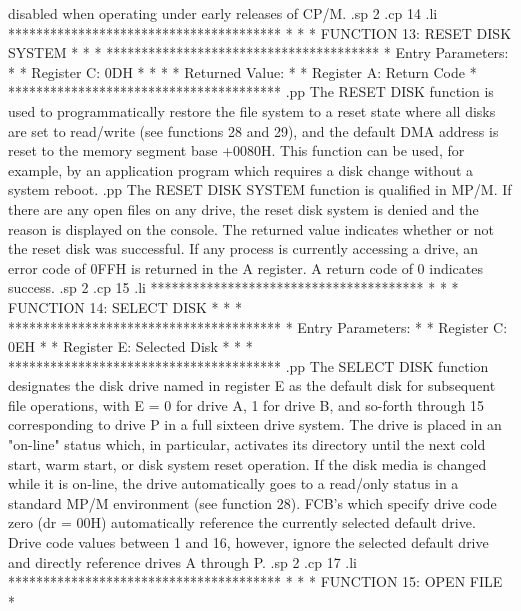 disabled when operating under early releases of CP/M.
.sp 2
.cp 14
.li
***************************************
*                                     *
*  FUNCTION 13: RESET DISK SYSTEM     *
*                                     *
***************************************
*  Entry Parameters:                  *
*      Register   C:  0DH             *
*                                     *
*  Returned Value:                    *
*      Register   A:  Return Code     *
***************************************
.pp
The RESET DISK function is used to programmatically restore
the file system to a reset state where all disks are set to
read/write (see functions 28 and 29),
and the default DMA address is reset to the memory segment base +0080H.
This function can be used, for example, by an application
program which requires a disk change without a system reboot.
.pp
The  RESET DISK SYSTEM function is qualified in  MP/M.  If
there  are  any open files on any  drive, the  reset  disk
system  is  denied  and  the reason  is  displayed  on  the
console.
The returned value indicates whether or not the reset  disk
was  successful.  If any process is currently accessing  a
drive, an error code of 0FFH is returned in the A register.
A return code of 0 indicates success.
.sp 2
.cp 15
.li
***************************************
*                                     *
*  FUNCTION 14: SELECT DISK           *
*                                     *
***************************************
*  Entry Parameters:                  *
*      Register   C:  0EH             *
*      Register   E:  Selected Disk   *
*                                     *
***************************************
.pp
The SELECT DISK function designates the disk drive named in
register E as the default disk for subsequent file operations,
with E = 0 for drive A, 1 for drive B, and so-forth through
15 corresponding to drive P in a full sixteen drive system.
The drive is placed in an "on-line" status which, in particular,
activates its directory until the next cold start, warm start,
or disk system reset operation.  If the disk media is changed
while it is on-line, the drive automatically goes to a read/only
status in a standard MP/M environment (see function 28).
FCB's which specify drive code zero (dr = 00H) automatically
reference the currently selected default drive.  Drive code
values between 1 and 16, however, ignore the selected default
drive and directly reference drives A through P.
.sp 2
.cp 17
.li
***************************************
*                                     *
*  FUNCTION 15: OPEN FILE             *
